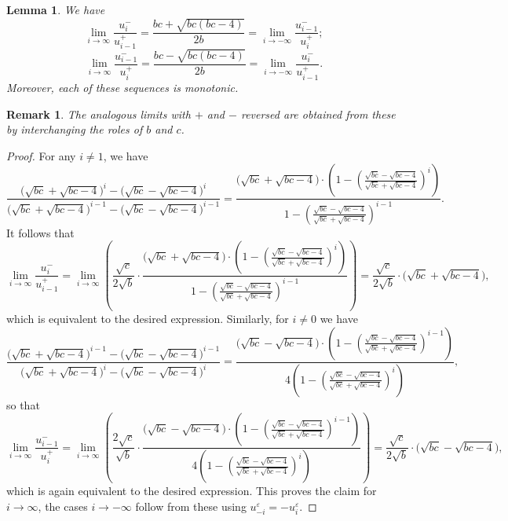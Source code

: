 \documentclass{amsart}
\newtheorem{lemma}[theorem]{Lemma}
\newtheorem{remark}[theorem]{Remark}
\numberwithin{theorem}{section}
\begin{document}
  \begin{lemma}
    \label{le:limits}
    We have
    \[\lim_{i\to\infty} \frac{u_i^-}{u_{i-1}^+}=\frac{bc+\sqrt{bc(bc-4)}}{2b}=\lim_{i\to-\infty} \frac{u_{i-1}^-}{u_i^+};\]
    \[\lim_{i\to\infty} \frac{u_{i-1}^-}{u_i^+}=\frac{bc-\sqrt{bc(bc-4)}}{2b}=\lim_{i\to-\infty} \frac{u_i^-}{u_{i-1}^+}.\]
    Moreover, each of these sequences is monotonic.
  \end{lemma}
  \begin{remark}
    The analogous limits with $+$ and $-$ reversed are obtained from these by interchanging the roles of $b$ and $c$.
  \end{remark}
  \begin{proof}
    For any $i\ne1$, we have
    \[\frac{\big(\sqrt{bc}+\sqrt{bc-4}\big)^i-\big(\sqrt{bc}-\sqrt{bc-4}\big)^i}{\big(\sqrt{bc}+\sqrt{bc-4}\big)^{i-1}-\big(\sqrt{bc}-\sqrt{bc-4}\big)^{i-1}}=\frac{\big(\sqrt{bc}+\sqrt{bc-4}\big)\cdot\left(1-\left(\frac{\sqrt{bc}-\sqrt{bc-4}}{\sqrt{bc}+\sqrt{bc-4}}\right)^i\right)}{1-\left(\frac{\sqrt{bc}-\sqrt{bc-4}}{\sqrt{bc}+\sqrt{bc-4}}\right)^{i-1}}.\]
    It follows that
    \[\lim_{i\to\infty} \frac{u_i^-}{u_{i-1}^+} = \lim_{i\to\infty} \left( \frac{\sqrt{c}}{2\sqrt{b}}\cdot\frac{\big(\sqrt{bc}+\sqrt{bc-4}\big)\cdot\left(1-\left(\frac{\sqrt{bc}-\sqrt{bc-4}}{\sqrt{bc}+\sqrt{bc-4}}\right)^i\right)}{1-\left(\frac{\sqrt{bc}-\sqrt{bc-4}}{\sqrt{bc}+\sqrt{bc-4}}\right)^{i-1}} \right) = \frac{\sqrt{c}}{2\sqrt{b}}\cdot\big(\sqrt{bc}+\sqrt{bc-4}\big),\]
    which is equivalent to the desired expression.
    Similarly, for $i\ne0$ we have
    \[\frac{\big(\sqrt{bc}+\sqrt{bc-4}\big)^{i-1}-\big(\sqrt{bc}-\sqrt{bc-4}\big)^{i-1}}{\big(\sqrt{bc}+\sqrt{bc-4}\big)^i-\big(\sqrt{bc}-\sqrt{bc-4}\big)^i}=\frac{\big(\sqrt{bc}-\sqrt{bc-4}\big)\cdot\left(1-\left(\frac{\sqrt{bc}-\sqrt{bc-4}}{\sqrt{bc}+\sqrt{bc-4}}\right)^{i-1}\right)}{4\left(1-\left(\frac{\sqrt{bc}-\sqrt{bc-4}}{\sqrt{bc}+\sqrt{bc-4}}\right)^i\right)},\]
    so that
    \[\lim_{i\to\infty} \frac{u_{i-1}^-}{u_i^+} = \lim_{i\to\infty} \left( \frac{2\sqrt{c}}{\sqrt{b}}\cdot\frac{\big(\sqrt{bc}-\sqrt{bc-4}\big)\cdot\left(1-\left(\frac{\sqrt{bc}-\sqrt{bc-4}}{\sqrt{bc}+\sqrt{bc-4}}\right)^{i-1}\right)}{4\left(1-\left(\frac{\sqrt{bc}-\sqrt{bc-4}}{\sqrt{bc}+\sqrt{bc-4}}\right)^i\right)} \right) = \frac{\sqrt{c}}{2\sqrt{b}}\cdot\big(\sqrt{bc}-\sqrt{bc-4}\big),\]
    which is again equivalent to the desired expression.
    This proves the claim for $i\to\infty$, the cases $i\to-\infty$ follow from these using $u_{-i}^\varepsilon=-u_i^\varepsilon$.


\end{proof}
\end{document}
